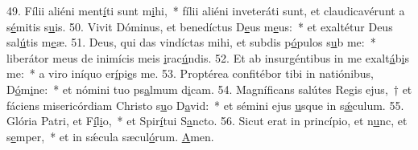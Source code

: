 49. Fílii aliéni ment\uline{í}ti sunt m\uline{i}hi,~* fílii aliéni inveteráti sunt, et claudicavérunt a s\uline{é}mitis s\uline{u}is.
50. Vivit Dóminus, et benedíctus D\uline{e}us m\uline{e}us:~* et exaltétur Deus sal\uline{ú}tis m\uline{e}æ.
51. Deus, qui das vindíctas mihi, et subdis p\uline{ó}pulos s\uline{u}b me:~* liberátor meus de inimícis meis \uline{i}rac\uline{ú}ndis.
52. Et ab insurgéntibus in me exalt\uline{á}b\uline{i}s me:~* a viro iníquo er\uline{í}pi\uline{e}s me.
53. Proptérea confitébor tibi in natiónibus, D\uline{ó}m\uline{i}ne:~* et nómini tuo ps\uline{a}lmum d\uline{i}cam.
54. Magníficans salútes Regis ejus,~† et fáciens misericórdiam Christo s\uline{u}o D\uline{a}vid:~* et sémini ejus \uline{u}sque in s\uline{ǽ}culum.
55. Glória Patri, et F\uline{í}l\uline{i}o,~* et Spir\uline{í}tui S\uline{a}ncto.
56. Sicut erat in princípio, et n\uline{u}nc, et s\uline{e}mper,~* et in sǽcula sæcul\uline{ó}rum. \uline{A}men.
